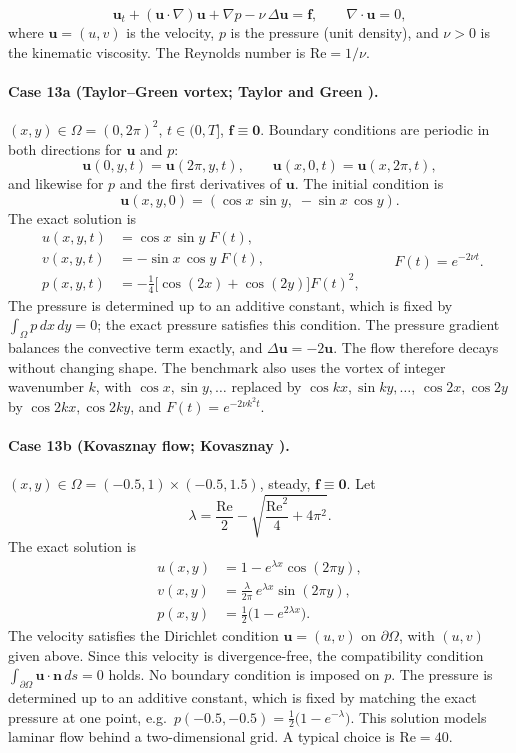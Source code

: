 \documentclass[11pt]{article}
\begin{document}
\[
\boxed{
\mathbf{u}_t+(\mathbf{u}\cdot\nabla)\mathbf{u}+\nabla p-\nu\,\Delta\mathbf{u}=\mathbf{f},
\qquad
\nabla\cdot\mathbf{u}=0
},
\]
where $\mathbf{u}=(u,v)$ is the velocity, $p$ is the pressure (unit
density), and $\nu>0$ is the kinematic viscosity. The Reynolds number is
$\mathrm{Re}=1/\nu$.

\paragraph{Case 13a (Taylor--Green vortex; Taylor and Green \cite{TG37}).}
$(x,y)\in\Omega=(0,2\pi)^2$, $t\in(0,T]$, $\mathbf{f}\equiv\mathbf{0}$.
Boundary conditions are periodic in both directions for $\mathbf{u}$ and $p$:
\[
\mathbf{u}(0,y,t)=\mathbf{u}(2\pi,y,t),\qquad
\mathbf{u}(x,0,t)=\mathbf{u}(x,2\pi,t),
\]
and likewise for $p$ and the first derivatives of $\mathbf{u}$. The
initial condition is
\[
\mathbf{u}(x,y,0)=(\cos x\,\sin y,\;-\sin x\,\cos y).
\]
The exact solution is
\[
\begin{aligned}
u(x,y,t)&=\cos x\,\sin y\;F(t),\\
v(x,y,t)&=-\sin x\,\cos y\;F(t),\\
p(x,y,t)&=-\frac14\bigl[\cos(2x)+\cos(2y)\bigr]F(t)^2,
\end{aligned}
\qquad F(t)=e^{-2\nu t}.
\]
The pressure is determined up to an additive constant, which is fixed by
$\int_\Omega p\,dx\,dy=0$; the exact pressure satisfies this condition.
The pressure gradient balances the convective term exactly, and
$\Delta\mathbf{u}=-2\mathbf{u}$. The flow therefore decays without
changing shape. The benchmark also uses the vortex of integer wavenumber
$k$, with $\cos x,\sin y,\ldots$ replaced by $\cos kx,\sin ky,\ldots$,
$\cos 2x,\cos 2y$ by $\cos 2kx,\cos 2ky$, and $F(t)=e^{-2\nu k^2t}$.

\paragraph{Case 13b (Kovasznay flow; Kovasznay \cite{Kov48}).}
$(x,y)\in\Omega=(-0.5,1)\times(-0.5,1.5)$, steady,
$\mathbf{f}\equiv\mathbf{0}$. Let
\[
\lambda=\frac{\mathrm{Re}}{2}-\sqrt{\frac{\mathrm{Re}^2}{4}+4\pi^2}.
\]
The exact solution is
\[
\begin{aligned}
u(x,y)&=1-e^{\lambda x}\cos(2\pi y),\\
v(x,y)&=\frac{\lambda}{2\pi}\,e^{\lambda x}\sin(2\pi y),\\
p(x,y)&=\frac12\bigl(1-e^{2\lambda x}\bigr).
\end{aligned}
\]
The velocity satisfies the Dirichlet condition $\mathbf{u}=(u,v)$ on
$\partial\Omega$, with $(u,v)$ given above. Since this velocity is
divergence-free, the compatibility condition
$\int_{\partial\Omega}\mathbf{u}\cdot\mathbf{n}\,ds=0$ holds. No boundary
condition is imposed on $p$. The pressure is determined up to an
additive constant, which is fixed by matching the exact pressure at one
point, e.g.\ $p(-0.5,-0.5)=\tfrac12\bigl(1-e^{-\lambda}\bigr)$. This
solution models laminar flow behind a two-dimensional grid. A typical
choice is $\mathrm{Re}=40$.
\end{document}
